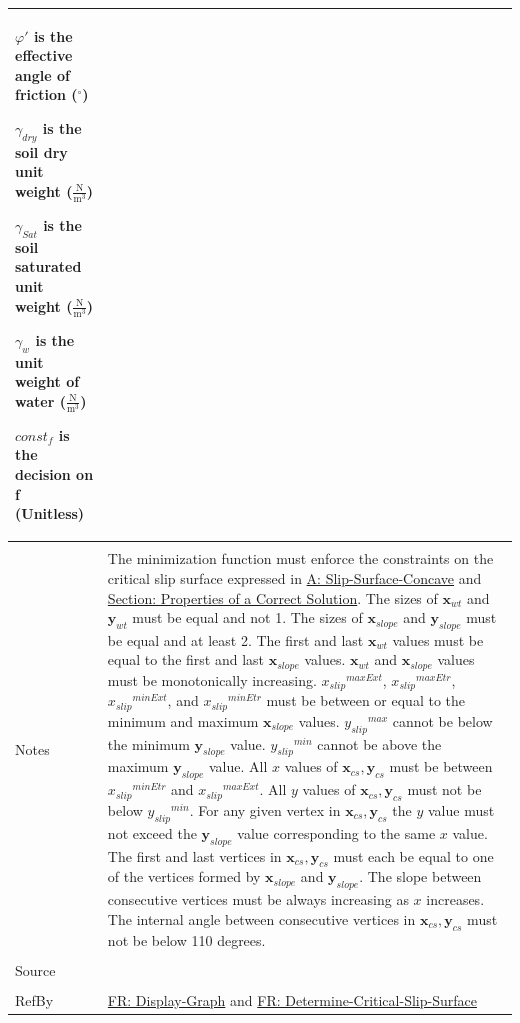 \documentclass[12pt]{article}
\begin{document}
\begin{minipage}{\textwidth}
\begin{tabular}{>{\raggedright}p{}>{\raggedright\arraybackslash}p{}}
\begin{symbDescription}
                        \item{$φ'$ is the effective angle of friction (${}^{\circ}$)}
                        \item{${γ_{dry}}$ is the soil dry unit weight ($\frac{\text{N}}{\text{m}^{3}}$)}
                        \item{${γ_{Sat}}$ is the soil saturated unit weight ($\frac{\text{N}}{\text{m}^{3}}$)}
                        \item{${γ_{w}}$ is the unit weight of water ($\frac{\text{N}}{\text{m}^{3}}$)}
                        \item{$const_f$ is the decision on f (Unitless)}
                        \end{symbDescription}
          \\ \midrule \\
          Notes & The minimization function must enforce the constraints on the critical slip surface expressed in \hyperref[assumpSSC]{A: Slip-Surface-Concave} and \hyperref[Sec:CorSolProps]{Section: Properties of a Correct Solution}. The sizes of ${\mathbf{x}_{wt}}$ and ${\mathbf{y}_{wt}}$ must be equal and not 1. The sizes of ${\mathbf{x}_{slope}}$ and ${\mathbf{y}_{slope}}$ must be equal and at least 2. The first and last ${\mathbf{x}_{wt}}$ values must be equal to the first and last ${\mathbf{x}_{slope}}$ values. ${\mathbf{x}_{wt}}$ and ${\mathbf{x}_{slope}}$ values must be monotonically increasing. ${{x_{slip}}^{maxExt}}$, ${{x_{slip}}^{maxEtr}}$, ${{x_{slip}}^{minExt}}$, and ${{x_{slip}}^{minEtr}}$ must be between or equal to the minimum and maximum ${\mathbf{x}_{slope}}$ values. ${{y_{slip}}^{max}}$ cannot be below the minimum ${\mathbf{y}_{slope}}$ value. ${{y_{slip}}^{min}}$ cannot be above the maximum ${\mathbf{y}_{slope}}$ value. All $x$ values of ${\mathbf{x}_{cs}},{\mathbf{y}_{cs}}$ must be between ${{x_{slip}}^{minEtr}}$ and ${{x_{slip}}^{maxExt}}$. All $y$ values of ${\mathbf{x}_{cs}},{\mathbf{y}_{cs}}$ must not be below ${{y_{slip}}^{min}}$. For any given vertex in ${\mathbf{x}_{cs}},{\mathbf{y}_{cs}}$ the $y$ value must not exceed the ${\mathbf{y}_{slope}}$ value corresponding to the same $x$ value. The first and last vertices in ${\mathbf{x}_{cs}},{\mathbf{y}_{cs}}$ must each be equal to one of the vertices formed by ${\mathbf{x}_{slope}}$ and ${\mathbf{y}_{slope}}$. The slope between consecutive vertices must be always increasing as $x$ increases. The internal angle between consecutive vertices in ${\mathbf{x}_{cs}},{\mathbf{y}_{cs}}$ must not be below 110 degrees.
          \\ \midrule \\
          Source & \cite{li2010}
          \\ \midrule \\
          RefBy & \hyperref[displayGraph]{FR: Display-Graph} and \hyperref[determineCritSlip]{FR: Determine-Critical-Slip-Surface}
          \\ \bottomrule
          \end{tabular}
          \end{minipage}
\end{document}
